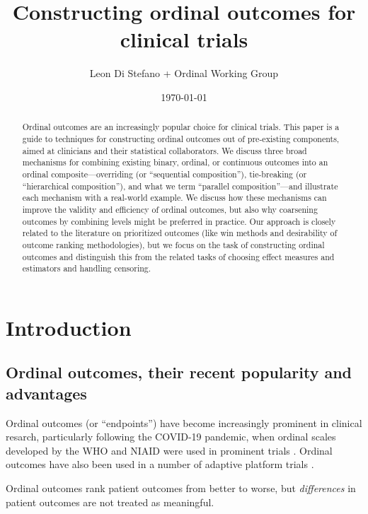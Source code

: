 \documentclass[
  11pt,
  fleqn
]{article}
\title{Constructing ordinal outcomes for clinical trials}
\author{Leon Di Stefano + Ordinal
Working Group}
\date{\today}
\begin{document}
\maketitle

\begin{abstract}
  Ordinal outcomes are an increasingly popular choice for
  clinical trials.
  This paper is a guide to techniques for constructing ordinal
  outcomes out of pre-existing components, aimed at clinicians and their
  statistical collaborators.
  We discuss three broad mechanisms for combining existing binary,
  ordinal, or continuous
  outcomes into an ordinal composite---overriding (or
  ``sequential composition''), tie-breaking (or ``hierarchical
  composition''), and what we term ``parallel
  composition''---and illustrate each mechanism with a real-world example.
  We discuss how these mechanisms can improve the validity and
  efficiency of ordinal outcomes, but also why coarsening outcomes by
  combining levels might be preferred in practice.
  Our approach is closely related to the literature on prioritized
  outcomes (like win methods and
    desirability of outcome
  ranking methodologies), but we focus on the task of
  constructing ordinal
  outcomes and distinguish this from the related tasks of choosing
  effect measures and estimators and
  handling censoring.
\end{abstract}
\newpage
\tableofcontents
\newpage

\section{Introduction}

\subsection{Ordinal outcomes, their recent popularity and advantages}

Ordinal outcomes (or ``endpoints'') have become increasingly
prominent in clinical
resarch, particularly following the COVID-19 pandemic, when ordinal
scales developed by the WHO and NIAID were used in prominent trials
\citep{beigelRemdesivirTreatmentCovid192020,
marshallMinimalCommonOutcome2020}. Ordinal outcomes have also
been used in a number of adaptive platform trials
\citep{angusREMAPCAPRandomizedEmbedded2020,
walkerCodesigningNovelOrdinal2025}.

Ordinal outcomes rank patient outcomes from better to worse, but
\emph{differences} in patient outcomes are
not treated as meaningful.
\end{document}

